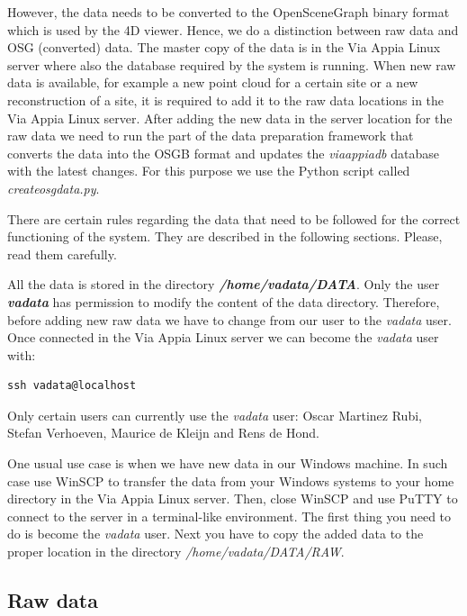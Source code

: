 \documentclass[a4paper,11pt]{article}
\begin{document}
However, the data needs to be converted to the OpenSceneGraph binary format which is used by the 4D viewer. Hence, we do a distinction between raw data and OSG (converted) data. The master copy of the data is in the Via Appia Linux server where also the database required by the system is running. When new raw data is available, for example a new point cloud for a certain site or a new reconstruction of a site, it is required to add it to the raw data locations in the Via Appia Linux server. After adding the new data in the server location for the raw data we need to run the part of the data preparation framework that converts the data into the OSGB format and updates the \textit{viaappiadb} database with the latest changes. For this purpose we use the Python script called \textit{createosgdata.py}.

There are certain rules regarding the data that need to be followed for the correct functioning of the system. They are described in the following sections. Please, read them carefully.

All the data is stored in the directory \textbf{\textit{/home/vadata/DATA}}. Only the user \textbf{\textit{vadata}} has permission to modify the content of the data directory. Therefore, before adding new raw data we have to change from our user to the \textit{vadata} user. Once connected in the Via Appia Linux server we can become the \textit{vadata} user with:

\begin{Verbatim}[fontfamily=courier,commandchars=\\\{\},fontsize=\footnotesize]
ssh vadata@localhost
\end{Verbatim}

Only certain users can currently use the \textit{vadata} user: Oscar Martinez Rubi, Stefan Verhoeven, Maurice de Kleijn and Rens de Hond.

One usual use case is when we have new data in our Windows machine. In such case use WinSCP to transfer the data from your Windows systems to your home directory in the Via Appia Linux server. Then, close WinSCP and use PuTTY to connect to the server in a terminal-like environment. The first thing you need to do is become the \textit{vadata} user. Next you have to copy the added data to the proper location in the directory \textit{/home/vadata/DATA/RAW}.

\subsection{Raw data}
\end{document}
